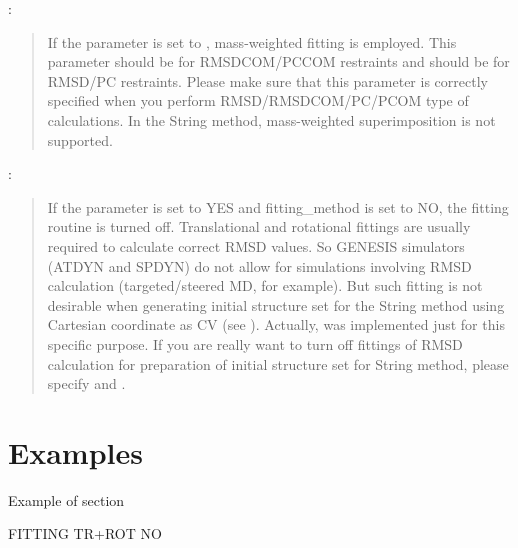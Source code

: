 \documentclass[a4paper,11pt,oneside,english]{sphinxmanual}
\begin{document}
: 
\begin{quote}


If the parameter is set to , mass-weighted fitting is employed.
This parameter should be  for RMSDCOM/PCCOM restraints
and should be  for RMSD/PC restraints. Please make sure that this
parameter is correctly specified when you perform RMSD/RMSDCOM/PC/PCOM
type of calculations.
In the String method, mass-weighted superimposition is not supported.
\end{quote}

: 
\begin{quote}


If the parameter is set to YES and fitting\_method is set to NO,
the fitting routine is turned off.
Translational and rotational fittings are
usually required to calculate correct RMSD values.
So GENESIS simulators (ATDYN and SPDYN) do not allow
 for simulations involving RMSD calculation
(targeted/steered MD, for example).
But such fitting is not desirable when generating initial
structure set for the String method using Cartesian coordinate as CV (see {\hyperref[\detokenize{15_RPath:rpath}]{}}).
Actually,  was implemented just for this specific purpose.
If you are really want to turn off fittings of RMSD calculation for preparation of
initial structure set for String method,
please specify  and .
\end{quote}


\section{Examples}
\label{\detokenize{13_Fitting:examples}}
Example of \sphinxstylestrong{{[}FITTING{]}} section

\begin{sphinxVerbatim}[commandchars=\\\{\}]
\PYG{o}{[}FITTING\PYG{o}{]}
  TR+ROT
     
      NO
\end{sphinxVerbatim}
\end{document}
